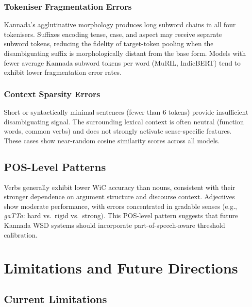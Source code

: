 \documentclass{ieeeaccess}
\begin{document}
\subsubsection{Tokeniser Fragmentation Errors}
Kannada's agglutinative morphology produces long subword chains in all four
tokenisers.
Suffixes encoding tense, case, and aspect may receive separate subword tokens,
reducing the fidelity of target-token pooling when the disambiguating suffix
is morphologically distant from the base form.
Models with fewer average Kannada subword tokens per word (MuRIL, IndicBERT)
tend to exhibit lower fragmentation error rates.

\subsubsection{Context Sparsity Errors}
Short or syntactically minimal sentences (fewer than 6 tokens) provide
insufficient disambiguating signal.
The surrounding lexical context is often neutral (function words, common verbs)
and does not strongly activate sense-specific features.
These cases show near-random cosine similarity scores across all models.

\subsection{POS-Level Patterns}

Verbs generally exhibit lower WiC accuracy than nouns, consistent with
their stronger dependence on argument structure and discourse context.
Adjectives show moderate performance, with errors concentrated in
gradable senses (e.g., \textit{gaTTa}: hard vs.\ rigid vs.\ strong).
This POS-level pattern suggests that future Kannada WSD systems should
incorporate part-of-speech-aware threshold calibration.

\section{Limitations and Future Directions}
\label{sec:limits}

\subsection{Current Limitations}
\end{document}
